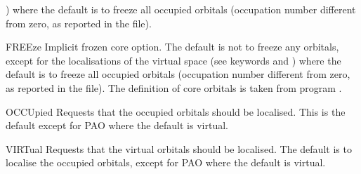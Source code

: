 \begin{keywordlist}
) where the default is to freeze all occupied orbitals (occupation
number different from zero, as reported in the  file).
\item[FREEze]
Implicit frozen core option. The default is not to freeze any orbitals,
except for the localisations of the virtual space (see keywords  and
) where the default is to freeze all occupied orbitals (occupation
number different from zero, as reported in the  file).
The definition of core orbitals is taken from program .
%
%
\item[OCCUpied]
Requests that the occupied orbitals should be localised. This is the default
except for PAO where the default is virtual.
%
\item[VIRTual]
Requests that the virtual orbitals should be localised. The default is
to localise the occupied orbitals, except for PAO where the default is
virtual.
%

\end{keywordlist}

